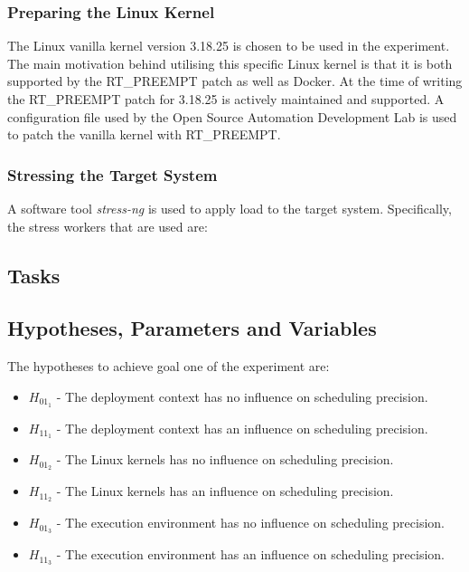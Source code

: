 \subsubsection{Preparing the Linux Kernel}
The Linux vanilla kernel version 3.18.25 is chosen to be used in the experiment. The main motivation behind utilising this specific Linux kernel is that it is both supported by the RT\_PREEMPT patch as well as Docker. At the time of writing the RT\_PREEMPT patch for 3.18.25 is actively maintained and supported. A configuration file used by the Open Source Automation Development Lab \cite{OSADL} is used to patch the vanilla kernel with RT\_PREEMPT.

\subsubsection{Stressing the Target System}
A software tool \textit{stress-ng} is used to apply load to the target system. Specifically, the stress workers that are used are:  



\subsection{Tasks}


\subsection{Hypotheses, Parameters and Variables}


The hypotheses to achieve goal one of the experiment are:
\begin{itemize}
\item $H_{01_{1}}$ - The deployment context has no influence on scheduling precision.
\item $H_{11_{1}}$ - The deployment context has an influence on scheduling precision.
\item $H_{01_{2}}$ - The Linux kernels has no influence on scheduling precision.
\item $H_{11_{2}}$ - The Linux kernels has an influence on scheduling precision.
\item $H_{01_{3}}$ - The execution environment has no influence on scheduling precision.
\item $H_{11_{3}}$ - The execution environment has an influence on scheduling precision.\\
\end{itemize}


